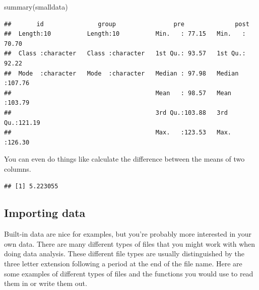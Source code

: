 \documentclass[
  oneside]{book}
\newenvironment{Shaded}{\begin{snugshade}}{\end{snugshade}}
\newcommand{\FunctionTok}[1]{\textcolor[rgb]{0.00,0.00,0.00}{#1}}
\newcommand{\NormalTok}[1]{#1}
\newcommand{\OtherTok}[1]{\textcolor[rgb]{0.56,0.35,0.01}{#1}}
\newcommand{\SpecialCharTok}[1]{\textcolor[rgb]{0.00,0.00,0.00}{#1}}
\begin{document}
\begin{Shaded}
\begin{Highlighting}[]
\FunctionTok{summary}\NormalTok{(smalldata)}
\end{Highlighting}
\end{Shaded}

\begin{verbatim}
##       id               group                pre              post       
##  Length:10          Length:10          Min.   : 77.15   Min.   : 70.70  
##  Class :character   Class :character   1st Qu.: 93.57   1st Qu.: 92.22  
##  Mode  :character   Mode  :character   Median : 97.98   Median :107.76  
##                                        Mean   : 98.57   Mean   :103.79  
##                                        3rd Qu.:103.88   3rd Qu.:121.19  
##                                        Max.   :123.53   Max.   :126.30
\end{verbatim}

You can even do things like calculate the difference between the means of two columns.

\begin{Shaded}
\end{Shaded}

\begin{verbatim}
## [1] 5.223055
\end{verbatim}

\hypertarget{import_data}{%
\subsection{Importing data}\label{import_data}}

Built-in data are nice for examples, but you're probably more interested in your own data. There are many different types of files that you might work with when doing data analysis. These different file types are usually distinguished by the three letter extension following a period at the end of the file name. Here are some examples of different types of files and the functions you would use to read them in or write them out.
\end{document}
